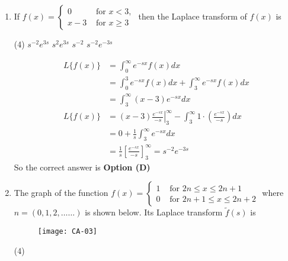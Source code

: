 \begin{enumerate}
\begin{tasks}(4)
	\task[\textbf{a.}]$e^{t}$
	\task[\textbf{b.}]$e^{t-2}$
	\task[\textbf{c.}]$t$
	\task[\textbf{d.}] $e^{2 t}$
\end{tasks}
\begin{answer}
	$$
	\begin{aligned}
	L^{-1}\left\lbrace  \frac{1}{s-2}\right\rbrace &=e^{2 t}
\end{aligned}
$$
	So the correct answer is \textbf{Option (d)}
\end{answer}
\item If $f(x)=\left\{\begin{array}{ll}0 & \text { for } x<3, \\ x-3 & \text { for } x \geq 3\end{array}\right.$ then the Laplace transform of $f(x)$ is
\begin{tasks}(4)
	\task[\textbf{A.}] $s^{-2} e^{3 s}$
	\task[\textbf{B.}] $s^{2} e^{3 s}$
	\task[\textbf{C.}] $s^{-2}$
	\task[\textbf{D.}] $s^{-2} e^{-3 s}$
\end{tasks}
\begin{answer}
	$$
	\begin{aligned}
	L\{f(x)\}&=\int_{0}^{\infty} e^{-s x} f(x) d x\\&=\int_{0}^{3} e^{-s x} f(x) d x+\int_{3}^{\infty} e^{-s x} f(x) d x\\&=\int_{3}^{\infty}(x-3) e^{-s x} d x\\
	L\{f(x)\}&=\left.(x-3) \frac{e^{-s x}}{-s}\right|_{3} ^{\infty}-\int_{3}^{\infty} 1 \cdot\left(\frac{e^{-s x}}{-s}\right) d x\\&=0+\frac{1}{s} \int_{3}^{\infty} e^{-s x} d x\\&=\frac{1}{s}\left[\frac{e^{-s x}}{-s}\right]_{3}^{\infty}=s^{-2} e^{-3 s}
	\end{aligned}
$$
	So the correct answer is \textbf{Option (D)}
\end{answer}
\item The graph of the function $f(x)=\left\{\begin{array}{ll}1 & \text { for } 2 n \leq x \leq 2 n+1 \\ 0 & \text { for } 2 n+1 \leq x \leq 2 n+2\end{array}\right.$ where $n=(0,1,2, \ldots \ldots)$ is shown below. Its Laplace transform $\tilde{f}(s)$ is
\begin{figure}[H]
	\centering
	\texttt{[image: CA-03]}
\end{figure}
\begin{tasks}(4)

\end{tasks}
\end{enumerate}
